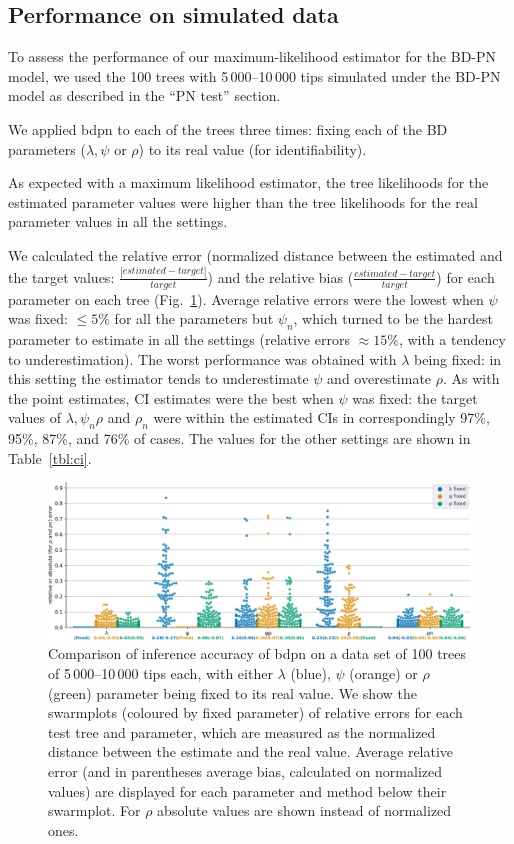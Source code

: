 \documentclass[a4paper,10pt]{article}
\begin{document}
\subsection{Performance on simulated data}

To assess the performance of our maximum-likelihood estimator for the BD-PN model, we used the 100 trees with 5\,000--10\,000 tips simulated under the BD-PN model as described in the ``PN test'' section.

We applied bdpn to each of the trees three times: fixing each of the BD parameters ($\lambda,\psi$ or $\rho$) to its real value (for identifiability). 


As expected with a maximum likelihood estimator, the tree likelihoods for the estimated parameter values were higher than the tree likelihoods for the real parameter values in all the settings.

We calculated the relative error (normalized distance between the estimated and the target values: $\frac{|estimated - target|}{target}$) and the relative bias ($\frac{estimated - target}{target}$) for each parameter on each tree (Fig.~\ref{fig:sim}). 
Average relative errors were the lowest when $\psi$ was fixed: $\leq 5\%$  for all the parameters but $\psi_n$, which turned to be the hardest parameter to estimate in all the settings (relative errors $\approx 15\%$, with a tendency to underestimation). 
The worst performance was obtained with $\lambda$ being fixed: in this setting the estimator tends to underestimate $\psi$ and overestimate $\rho$.
As with the point estimates, CI estimates were the best when $\psi$ was fixed: the target values of $\lambda, \psi_{n} \rho$ and $\rho_n$ were within the estimated CIs in correspondingly 97\%, 95\%, 87\%, and 76\% of cases. The values for the other settings are shown in Table~\ref{tbl:ci}.

\begin{figure}[!pht]
\centering 
\includegraphics[width=1\textwidth]{Fig_errors.eps}
\caption{Comparison of inference accuracy of bdpn on a data set of 100 trees of 5\,000--10\,000 tips each, with either $\lambda$ (blue), $\psi$ (orange) or $\rho$ (green) parameter being fixed to its real value.
We show the swarmplots (coloured by fixed parameter) of relative errors for each test tree and parameter, which are measured as the normalized distance between the estimate and the real value. Average relative error (and in parentheses average bias, calculated on normalized values) are displayed for each parameter and method below their swarmplot. For $\rho$ absolute values are shown instead of normalized ones. } 
\label{fig:sim} 
\end{figure}
 
\end{document}
